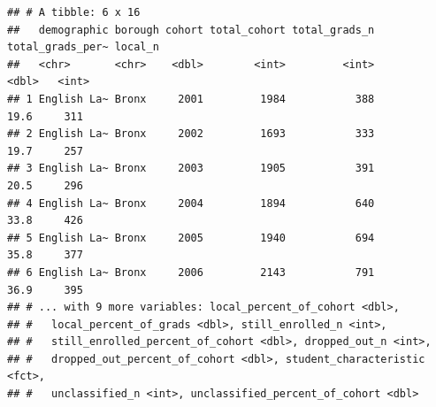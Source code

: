 \documentclass[
  english,
  man, fleqn, noextraspace]{apa6}
\newenvironment{Shaded}{\begin{snugshade}}{\end{snugshade}}
\newcommand{\CommentTok}[1]{\textcolor[rgb]{0.56,0.35,0.01}{\textit{#1}}}
\newcommand{\DataTypeTok}[1]{\textcolor[rgb]{0.13,0.29,0.53}{#1}}
\newcommand{\KeywordTok}[1]{\textcolor[rgb]{0.13,0.29,0.53}{\textbf{#1}}}
\newcommand{\NormalTok}[1]{#1}
\newcommand{\OperatorTok}[1]{\textcolor[rgb]{0.81,0.36,0.00}{\textbf{#1}}}
\newcommand{\StringTok}[1]{\textcolor[rgb]{0.31,0.60,0.02}{#1}}
\begin{document}
\begin{verbatim}
## # A tibble: 6 x 16
##   demographic borough cohort total_cohort total_grads_n total_grads_per~ local_n
##   <chr>       <chr>    <dbl>        <int>         <int>            <dbl>   <int>
## 1 English La~ Bronx     2001         1984           388             19.6     311
## 2 English La~ Bronx     2002         1693           333             19.7     257
## 3 English La~ Bronx     2003         1905           391             20.5     296
## 4 English La~ Bronx     2004         1894           640             33.8     426
## 5 English La~ Bronx     2005         1940           694             35.8     377
## 6 English La~ Bronx     2006         2143           791             36.9     395
## # ... with 9 more variables: local_percent_of_cohort <dbl>,
## #   local_percent_of_grads <dbl>, still_enrolled_n <int>,
## #   still_enrolled_percent_of_cohort <dbl>, dropped_out_n <int>,
## #   dropped_out_percent_of_cohort <dbl>, student_characteristic <fct>,
## #   unclassified_n <int>, unclassified_percent_of_cohort <dbl>
\end{verbatim}

\begin{Shaded}
\end{Shaded}
\end{document}
